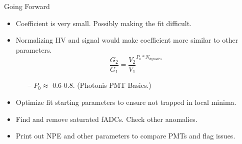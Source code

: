 \documentclass[10pt]{beamer}
\begin{document}
\begin{frame}{Going Forward}

	\begin{itemize}
		\item Coefficient is very small. Possibly making the fit difficult. 
		\item Normalizing HV and signal would make coefficient more similar to other parameters.
		\begin{equation}
			\frac{G_2}{G_1} = \frac{V_2}{V_1}^{P_0 * N_{dynodes}}
		\end{equation}
			\begin{itemize}
				\item[--] $P_0 \approx$ 0.6-0.8. (Photonis PMT Basics.)  
			\end{itemize}
		\item Optimize fit starting parameters to ensure not trapped in local minima.
		\item Find and remove saturated fADCs. Check other anomalies.
		\item Print out NPE and other parameters to compare PMTs and flag issues.
	\end{itemize}

\end{frame}
\end{document}
